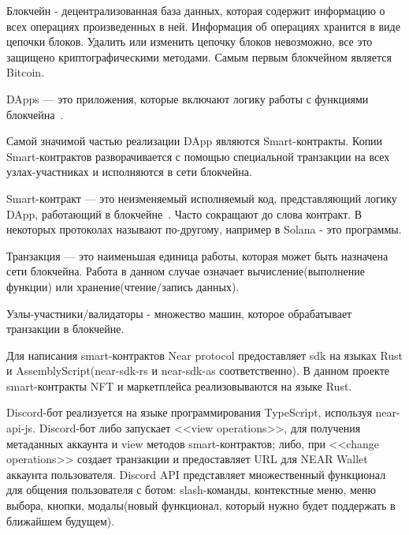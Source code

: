 \begin{definition}
    Блокчейн - децентрализованная база данных, которая содержит информацию о всех операциях произведенных в ней.
    Информация об операциях хранится в виде цепочки блоков.  Удалить или изменить цепочку блоков невозможно, все это защищено криптографическими методами. Самым первым блокчейном является Bitcoin\cite{nakamoto2012bitcoin}.
\end{definition}

\begin{definition}
    DApps --- это приложения, которые включают логику работы с функциями блокчейна~\cite{ramamurthy2020blockchain}.
\end{definition}

Самой значимой частью реализации DApp являются Smart-контракты. Копии Smart-контрактов разворачивается с помощью специальной транзакции на всех узлах-участниках и исполняются в сети блокчейна.

\begin{definition}
    Smart-контракт --- это неизменяемый исполняемый код, представляющий логику DApp, работающий в блокчейне~\cite{ramamurthy2020blockchain}. Часто сокращают до слова контракт. В некоторых протоколах называют по-другому, например в Solana - это программы\cite{solanaprogramlibrarydocs}.
\end{definition}

\begin{definition}
    Транзакция — это наименьшая единица работы, которая может быть назначена сети блокчейна. Работа в данном случае означает вычисление(выполнение функции) или хранение(чтение/запись данных)\cite{neardocumentationtransaction}.
\end{definition}

\begin{definition}
    Узлы-участники/валидаторы - множество машин, которое обрабатывает транзакции в блокчейне.
\end{definition}

Для написания smart-контрактов Near protocol предоставляет sdk на языках Rust и AssemblyScript(near-sdk-rs\cite{nearsdkrs} и near-sdk-as\cite{nearsdkas} соответственно). В данном проекте smart-контракты NFT и маркетплейса реализовываются на языке Rust.

Discord-бот реализуется на языке программирования TypeScript, используя near-api-js\cite{nearapijs}. Discord-бот либо запускает <<view operations>>, для получения метаданных аккаунта и view методов smart-контрактов; либо, при <<change operations>> создает транзакции и предоставляет URL для NEAR Wallet аккаунта пользователя. Discord API представляет множественный функционал для общения пользователя с ботом: slash-команды\cite{discordjsbuttons}, контекстные меню\cite{discordtscontextmenu}, меню выбора\cite{discordjsselectmenus}, кнопки\cite{discordjsbuttons}, модалы\cite{discordjsmodals}(новый функционал, который нужно будет поддержать в ближайшем будущем).


